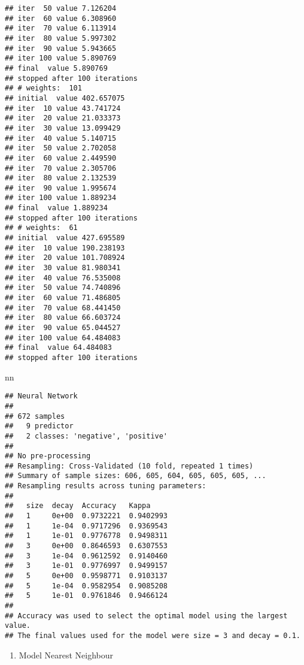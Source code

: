 \documentclass[]{article}
\newenvironment{Shaded}{\begin{snugshade}}{\end{snugshade}}
\newcommand{\NormalTok}[1]{#1}
\providecommand{\tightlist}{%
  \setlength{\itemsep}{0pt}\setlength{\parskip}{0pt}}
\begin{document}
\begin{verbatim}
## iter  50 value 7.126204
## iter  60 value 6.308960
## iter  70 value 6.113914
## iter  80 value 5.997302
## iter  90 value 5.943665
## iter 100 value 5.890769
## final  value 5.890769 
## stopped after 100 iterations
## # weights:  101
## initial  value 402.657075 
## iter  10 value 43.741724
## iter  20 value 21.033373
## iter  30 value 13.099429
## iter  40 value 5.140715
## iter  50 value 2.702058
## iter  60 value 2.449590
## iter  70 value 2.305706
## iter  80 value 2.132539
## iter  90 value 1.995674
## iter 100 value 1.889234
## final  value 1.889234 
## stopped after 100 iterations
## # weights:  61
## initial  value 427.695589 
## iter  10 value 190.238193
## iter  20 value 101.708924
## iter  30 value 81.980341
## iter  40 value 76.535008
## iter  50 value 74.740896
## iter  60 value 71.486805
## iter  70 value 68.441450
## iter  80 value 66.603724
## iter  90 value 65.044527
## iter 100 value 64.484083
## final  value 64.484083 
## stopped after 100 iterations
\end{verbatim}

\begin{Shaded}
\begin{Highlighting}[]
\NormalTok{nn}
\end{Highlighting}
\end{Shaded}

\begin{verbatim}
## Neural Network 
## 
## 672 samples
##   9 predictor
##   2 classes: 'negative', 'positive' 
## 
## No pre-processing
## Resampling: Cross-Validated (10 fold, repeated 1 times) 
## Summary of sample sizes: 606, 605, 604, 605, 605, 605, ... 
## Resampling results across tuning parameters:
## 
##   size  decay  Accuracy   Kappa    
##   1     0e+00  0.9732221  0.9402993
##   1     1e-04  0.9717296  0.9369543
##   1     1e-01  0.9776778  0.9498311
##   3     0e+00  0.8646593  0.6307553
##   3     1e-04  0.9612592  0.9140460
##   3     1e-01  0.9776997  0.9499157
##   5     0e+00  0.9598771  0.9103137
##   5     1e-04  0.9582954  0.9085208
##   5     1e-01  0.9761846  0.9466124
## 
## Accuracy was used to select the optimal model using the largest value.
## The final values used for the model were size = 3 and decay = 0.1.
\end{verbatim}

\begin{enumerate}
\def\labelenumi{\arabic{enumi}.}
\setcounter{enumi}{3}
\tightlist
\item
  Model Nearest Neighbour
\end{enumerate}
\end{document}
